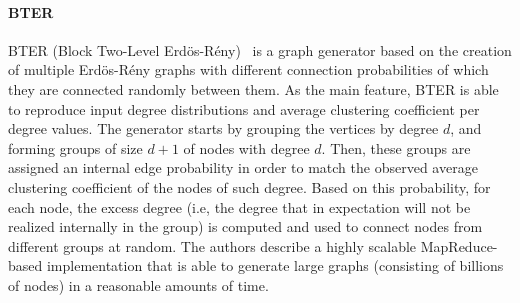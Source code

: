 
\paragraph{BTER} BTER (Block Two-Level
Erd\"{o}s-R\'{e}ny)~\cite{kolda2014scalable} is a graph generator based on the
creation of multiple Erd\"{o}s-R\'{e}ny graphs with different connection
probabilities  of which they are connected randomly between them. As the main feature, BTER is able
to reproduce input degree distributions and average clustering
coefficient per degree values. The generator starts by grouping the vertices
by degree $d$, and forming groups of size $d+1$ of nodes with degree $d$. Then, these
groups are assigned an internal edge probability in order to match the observed
average clustering coefficient of the nodes of such degree. Based on this
probability, for each node, the excess degree (i.e, the degree that in
expectation will not be realized internally in the group) is computed and used to connect
nodes from different groups at random. The authors describe a highly scalable
MapReduce-based implementation that is able to generate large graphs (consisting of
billions of nodes) in a reasonable amounts of time.

